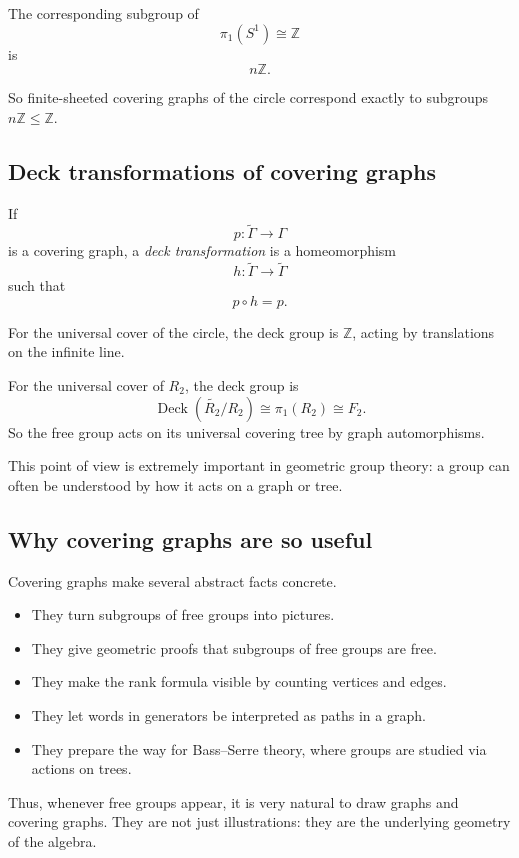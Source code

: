 \documentclass[12pt,a4paper]{article}
\DeclareMathOperator{\Deck}{Deck}
\theoremstyle{notespace}
\begin{document}
The corresponding subgroup of
\[
\pi_1(S^1)\cong \mathbb Z
\]
is
\[
n\mathbb Z.
\]

So finite-sheeted covering graphs of the circle correspond exactly to subgroups \(n\mathbb Z\leq \mathbb Z\).

\subsection{Deck transformations of covering graphs}

If
\[
p:\widetilde{\Gamma}\to \Gamma
\]
is a covering graph, a \emph{deck transformation} is a homeomorphism
\[
h:\widetilde{\Gamma}\to \widetilde{\Gamma}
\]
such that
\[
p\circ h=p.
\]

For the universal cover of the circle, the deck group is \(\mathbb Z\), acting by translations on the infinite line.

For the universal cover of \(R_2\), the deck group is
\[
\Deck(\widetilde{R_2}/R_2)\cong \pi_1(R_2)\cong F_2.
\]
So the free group acts on its universal covering tree by graph automorphisms.

This point of view is extremely important in geometric group theory: a group can often be understood by how it acts on a graph or tree.

\subsection{Why covering graphs are so useful}

Covering graphs make several abstract facts concrete.

\begin{itemize}
	\item They turn subgroups of free groups into pictures.
	\item They give geometric proofs that subgroups of free groups are free.
	\item They make the rank formula visible by counting vertices and edges.
	\item They let words in generators be interpreted as paths in a graph.
	\item They prepare the way for Bass--Serre theory, where groups are studied via actions on trees.
\end{itemize}

Thus, whenever free groups appear, it is very natural to draw graphs and covering graphs. They are not just illustrations: they are the underlying geometry of the algebra.
\end{document}
